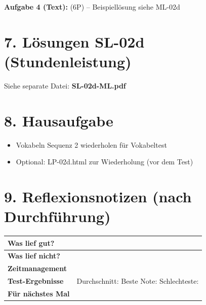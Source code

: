 \documentclass[11pt, a4paper]{article}
\begin{document}
\textbf{Aufgabe 4 (Text):} (6P) -- Beispiellösung siehe ML-02d


\section*{7. Lösungen SL-02d (Stundenleistung)}

Siehe separate Datei: \textbf{SL-02d-ML.pdf}


\section*{8. Hausaufgabe}

\begin{itemize}
    \item Vokabeln Sequenz 2 wiederholen für Vokabeltest
    \item Optional: LP-02d.html zur Wiederholung (vor dem Test)
\end{itemize}


\section*{9. Reflexionsnotizen (nach Durchführung)}

\begin{tabularx}{\textwidth}{|l|X|}
\hline
\textbf{Was lief gut?} & \\[2em]
\hline
\textbf{Was lief nicht?} & \\[2em]
\hline
\textbf{Zeitmanagement} & \\[2em]
\hline
\textbf{Test-Ergebnisse} & Durchschnitt: \hspace{2cm} Beste Note: \hspace{2cm} Schlechteste: \\[1em]
\hline
\textbf{Für nächstes Mal} & \\[2em]
\hline
\end{tabularx}
\end{document}
